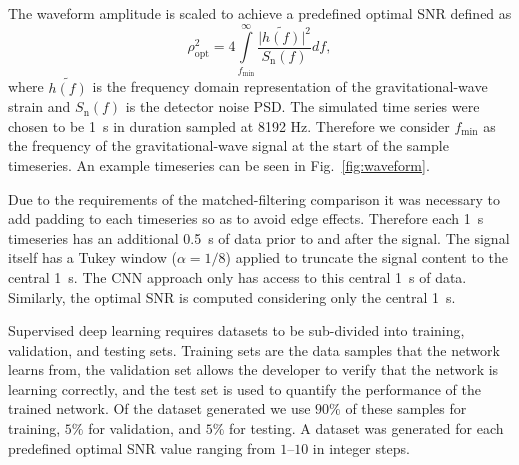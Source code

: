 \documentclass[%
showpacs,
 amsmath,amssymb,
 aps,
 twocolumn,
 prl,
 reprint,
floatfix,
]{revtex4-1}
\newcommand{\fergus}[1]{\textbf{\textcolor{cyan}{FERGUS: #1}}}
\begin{document}

%
%
The waveform amplitude is scaled to achieve a predefined optimal \ac{SNR}
defined as
%
%
\begin{equation}\label{eq:snr} 
\rho_{\mathrm{opt}}^{2} = 4
\int\limits_{f_{\mathrm{min}}}^{\infty} \frac{\lvert
\tilde{h(f)}\rvert^{2}}{S_{\mathrm{n}}(f)} df,
\end{equation}
%
where $\tilde{h(f)}$ is the frequency domain representation of the
gravitational-wave strain and $S_{\mathrm{n}}(f)$ is the detector noise
\ac{PSD}. The simulated time series were chosen to be 1~s in duration sampled
at 8192 Hz. Therefore we consider $f_{\mathrm{min}}$ as the frequency of the
gravitational-wave signal at the start of the sample timeseries. An example
timeseries can be seen in Fig.~\ref{fig:waveform}. 

%
%
Due to the requirements of the matched-filtering comparison it was necessary to
add padding to each timeseries so as to avoid edge effects. Therefore
each 1~s timeseries has an additional 0.5~s of data prior to and after the signal.
The signal itself has a Tukey window ($\alpha=1/8$) applied to truncate the
signal content to the central 1~s. The \ac{CNN} approach only has access to
this central 1~s of data. Similarly, the optimal \ac{SNR} is computed considering
only the central 1~s.

%
%
Supervised deep learning requires datasets to be sub-divided into training,
validation, and testing sets. Training sets are the data samples that the
network learns from, the validation set allows the developer to verify that the
network is learning correctly, and the test set is used to quantify the
performance of the trained network.  Of the dataset generated we use $90\%$ of
these samples for training, $5\%$ for validation, and $5\%$ for testing. A
dataset was generated for each predefined optimal \ac{SNR} value ranging
from $1$--$10$ in integer steps. 
\end{document}
